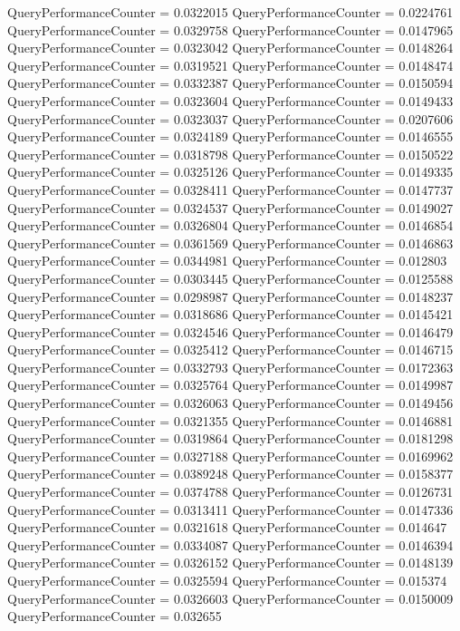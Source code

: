 \documentclass[9pt]{article}
\theoremstyle{plain}
\theoremstyle{definition}
\theoremstyle{remark}
\numberwithin{equation}{section}
\begin{document}
QueryPerformanceCounter  =  0.0322015
QueryPerformanceCounter  =  0.0224761
QueryPerformanceCounter  =  0.0329758
QueryPerformanceCounter  =  0.0147965
QueryPerformanceCounter  =  0.0323042
QueryPerformanceCounter  =  0.0148264
QueryPerformanceCounter  =  0.0319521
QueryPerformanceCounter  =  0.0148474
QueryPerformanceCounter  =  0.0332387
QueryPerformanceCounter  =  0.0150594
QueryPerformanceCounter  =  0.0323604
QueryPerformanceCounter  =  0.0149433
QueryPerformanceCounter  =  0.0323037
QueryPerformanceCounter  =  0.0207606
QueryPerformanceCounter  =  0.0324189
QueryPerformanceCounter  =  0.0146555
QueryPerformanceCounter  =  0.0318798
QueryPerformanceCounter  =  0.0150522
QueryPerformanceCounter  =  0.0325126
QueryPerformanceCounter  =  0.0149335
QueryPerformanceCounter  =  0.0328411
QueryPerformanceCounter  =  0.0147737
QueryPerformanceCounter  =  0.0324537
QueryPerformanceCounter  =  0.0149027
QueryPerformanceCounter  =  0.0326804
QueryPerformanceCounter  =  0.0146854
QueryPerformanceCounter  =  0.0361569
QueryPerformanceCounter  =  0.0146863
QueryPerformanceCounter  =  0.0344981
QueryPerformanceCounter  =  0.012803
QueryPerformanceCounter  =  0.0303445
QueryPerformanceCounter  =  0.0125588
QueryPerformanceCounter  =  0.0298987
QueryPerformanceCounter  =  0.0148237
QueryPerformanceCounter  =  0.0318686
QueryPerformanceCounter  =  0.0145421
QueryPerformanceCounter  =  0.0324546
QueryPerformanceCounter  =  0.0146479
QueryPerformanceCounter  =  0.0325412
QueryPerformanceCounter  =  0.0146715
QueryPerformanceCounter  =  0.0332793
QueryPerformanceCounter  =  0.0172363
QueryPerformanceCounter  =  0.0325764
QueryPerformanceCounter  =  0.0149987
QueryPerformanceCounter  =  0.0326063
QueryPerformanceCounter  =  0.0149456
QueryPerformanceCounter  =  0.0321355
QueryPerformanceCounter  =  0.0146881
QueryPerformanceCounter  =  0.0319864
QueryPerformanceCounter  =  0.0181298
QueryPerformanceCounter  =  0.0327188
QueryPerformanceCounter  =  0.0169962
QueryPerformanceCounter  =  0.0389248
QueryPerformanceCounter  =  0.0158377
QueryPerformanceCounter  =  0.0374788
QueryPerformanceCounter  =  0.0126731
QueryPerformanceCounter  =  0.0313411
QueryPerformanceCounter  =  0.0147336
QueryPerformanceCounter  =  0.0321618
QueryPerformanceCounter  =  0.014647
QueryPerformanceCounter  =  0.0334087
QueryPerformanceCounter  =  0.0146394
QueryPerformanceCounter  =  0.0326152
QueryPerformanceCounter  =  0.0148139
QueryPerformanceCounter  =  0.0325594
QueryPerformanceCounter  =  0.015374
QueryPerformanceCounter  =  0.0326603
QueryPerformanceCounter  =  0.0150009
QueryPerformanceCounter  =  0.032655
\end{document}
